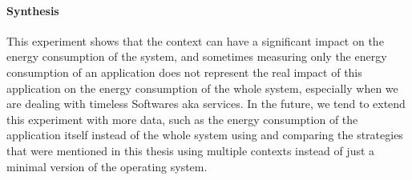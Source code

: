 \paragraph*{Synthesis}
This experiment shows that the context can have a significant impact on the energy consumption of the system, and sometimes measuring only the energy consumption of an application does not represent the real impact of this application on the energy consumption of the whole system, especially when we are dealing with timeless Softwares aka services.
In the future, we tend to extend this experiment with more data, such as the energy consumption of the application itself instead of the whole system using \cite{fieni2020smartwatts} and comparing the strategies that were mentioned in this thesis using multiple contexts instead of just a minimal version of the operating system.

